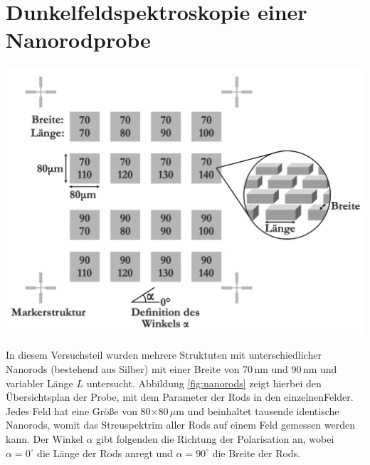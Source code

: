 \newpage
\section{Dunkelfeldspektroskopie einer Nanorodprobe}
\label{sec:nanorods}

\begin{center}
    \captionsetup{type = figure}
    \includegraphics[width = \textwidth]{Bilder/Nanorods.png}
    \label{fig:nanorods}
\end{center}

In diesem Versuchsteil wurden mehrere Struktuten mit unterschiedlicher Nanorods (bestehend aus Silber) mit einer Breite von 70\,nm und 90\,nm und variabler Länge $L$ untersucht. Abbildung \ref{fig:nanorods} zeigt hierbei den Übersichtsplan der Probe, mit dem Parameter der Rods in den einzelnenFelder. Jedes Feld hat eine Größe von 80$\times$80\,$\mu$m und beinhaltet tausende identische Nanorods, womit das Streuspektrim aller Rods auf einem Feld gemessen werden kann. Der Winkel $\alpha$ gibt folgenden die Richtung der Polarisation an, wobei $\alpha = 0^\circ$ die Länge der Rods anregt und $\alpha = 90^\circ$ die Breite der Rods. \cite{Anleitung}

